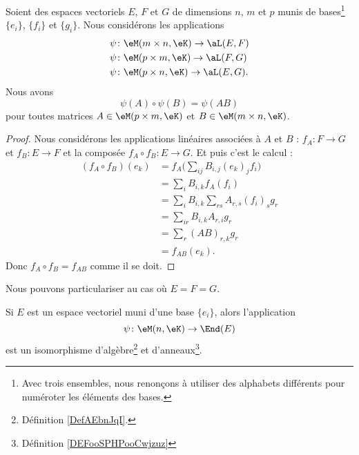 \begin{proposition}     \label{PROPooCSJNooEqcmFm}
	Soient des espaces vectoriels \( E\), \( F\) et \( G\) de dimensions \( n\), \( m\) et \( p\) munis de bases\footnote{Avec trois ensembles, nous renonçons à utiliser des alphabets différents pour numéroter les éléments des bases.} \( \{ e_i \}\), \( \{ f_i \}\) et \( \{ g_i \}\). Nous considérons les applications
	\begin{subequations}
		\begin{align}
			\psi & \colon \eM(m\times n,\eK)\to \aL(E,F)  \\
			\psi & \colon \eM(p\times m,\eK)\to \aL(F,G)  \\
			\psi & \colon \eM(p\times n,\eK)\to \aL(E,G).
		\end{align}
	\end{subequations}
	Nous avons
	\begin{equation}
		\psi(A)\circ \psi(B)=\psi(AB)
	\end{equation}
	pour toutes matrices \( A\in \eM(p\times m,\eK)\) et \( B\in \eM(m\times n,\eK)\).
\end{proposition}

\begin{proof}
	Nous considérons les applications linéaires associées à \( A\) et \( B\) : \( f_A\colon F\to G\) et \( f_B\colon E\to F\) et la composée \( f_A\circ f_B\colon E\to G\). Et puis c'est le calcul :
	\begin{subequations}
		\begin{align}
			(f_A\circ f_B)(e_k) & =f_A\big( \sum_{ij}B_{i,j}(e_k)_j f_i \big) \\
			                    & =\sum_i B_{i,k}f_A(f_i)                     \\
			                    & =\sum_iB_{i,k}\sum_{rs}A_{r,s}(f_i)_s g_r   \\
			                    & =\sum_{ir}B_{i,k}A_{r,i} g_r                \\
			                    & =\sum_r(AB)_{r,k} g_r                       \\
			                    & =f_{AB}(e_k).
		\end{align}
	\end{subequations}
	Donc \( f_A\circ f_B=f_{AB}\) comme il se doit.
\end{proof}

Nous pouvons particulariser au cas où \( E=F=G\).
\begin{proposition}     \label{PROPooFMBFooEVCLKA}
	Si \( E\) est un espace vectoriel muni d'une base \( \{ e_i \}\), alors l'application
	\begin{equation}
		\psi\colon \eM(n,\eK)\to \End(E)
	\end{equation}
	est un isomorphisme d'algèbre\footnote{Définition \ref{DefAEbnJqI}.} et d'anneaux\footnote{Définition \ref{DEFooSPHPooCwjzuz}}.
\end{proposition}

